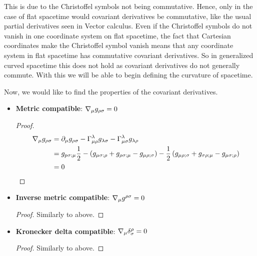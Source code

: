 \documentclass{article}
\begin{document}
 			This is due to the Christoffel symbols not being commutative. Hence, only in the case of flat spacetime would covariant derivatives be commutative, like the usual partial derivatives seen in Vector calculus. Even if the Christoffel symbols do not vanish in one coordinate system on flat spacetime, the fact that Cartesian coordinates make the Christoffel symbol vanish means that any coordinate system in flat spacetime has commutative covariant derivatives. So in generalized curved spacetime this does not hold as covariant derivatives do not generally commute. With this we will be able to begin defining the curvature of spacetime.
 			
 			Now, we would like to find the properties of the covariant derivatives.
 			\begin{itemize}
 				\item \textbf{Metric compatible}: $\nabla_\mu g_{\rho\sigma} = 0$
 				\subitem \vspace{-1cm} \begin{proof}
 					\vspace{-1.8cm}
 					\begin{align*}
 						\nabla_\mu g_{\rho \sigma} &= \partial_\mu g_{\rho\sigma} - \Gamma^\lambda_{\mu\rho} g_{\lambda \sigma} - \Gamma_{\mu\sigma}^\lambda g_{\lambda \rho} \\
 						&= g_{p\sigma;\mu} \frac12 - \left( g_{\mu\sigma;\rho} + g_{\rho\sigma;\mu} - g_{\mu\rho;\sigma} \right) - \frac 12 \left(
 						g_{\mu\rho;\sigma} + g_{\sigma\rho;\mu} - g_{\mu\sigma;\rho} \right) \\
 						&= 0
 					\end{align*}
 				\end{proof}
 			\pagebreak
 				\item \textbf{Inverse metric compatible}: $\nabla_\mu g^{\rho\sigma} = 0$
 				\subitem \vspace{-1cm}
 				\begin{proof}
 					Similarly to above.
 				\end{proof}
 				\item \textbf{Kronecker delta compatible}: $\nabla_\mu \delta^{\rho}_{\sigma} = 0$
 				\subitem \vspace{-1cm} \begin{proof}
 					Similarly to above.
 				\end{proof}
 			\end{itemize}
\end{document}
